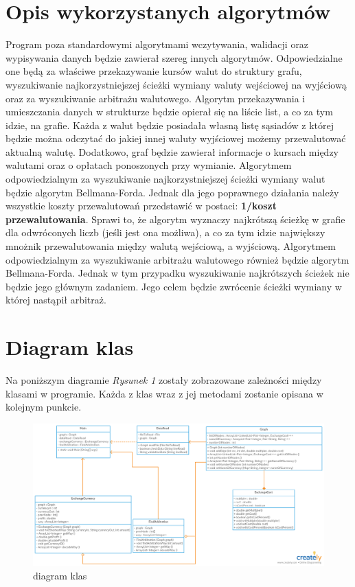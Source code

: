 ﻿\documentclass[12pt]{article}
\begin{document}
\section{Opis wykorzystanych algorytmów}
Program poza standardowymi algorytmami wczytywania, walidacji oraz wypisywania danych będzie zawierał szereg innych algorytmów. Odpowiedzialne one będą za właściwe przekazywanie kursów walut do struktury grafu, wyszukiwanie najkorzystniejszej ścieżki wymiany waluty wejściowej na wyjściową oraz za wyszukiwanie arbitrażu walutowego.
\newline\newline
Algorytm przekazywania i umieszczania danych w strukturze będzie opierał się na liście list, a co za tym idzie, na grafie. Każda z walut będzie posiadała własną listę sąsiadów z której będzie można odczytać do jakiej innej waluty wyjściowej możemy przewalutować aktualną walutę. Dodatkowo, graf będzie zawierał informacje o kursach między walutami oraz o opłatach ponoszonych przy wymianie.
\newline\newline
Algorytmem odpowiedzialnym za wyszukiwanie najkorzystniejszej ścieżki wymiany walut będzie algorytm Bellmana-Forda. Jednak dla jego poprawnego działania należy wszystkie koszty przewalutowań przedstawić w postaci: \textbf{1/koszt przewalutowania}. Sprawi to, że algorytm wyznaczy najkrótszą ścieżkę w grafie dla odwróconych liczb (jeśli jest ona możliwa), a co za tym idzie największy mnożnik przewalutowania między walutą wejściową, a wyjściową.
\newline\newline
Algorytmem odpowiedzialnym za wyszukiwanie arbitrażu walutowego również będzie algorytm Bellmana-Forda. Jednak w tym przypadku wyszukiwanie najkrótszych ścieżek nie będzie jego głównym zadaniem. Jego celem będzie zwrócenie ścieżki wymiany w której nastąpił arbitraż.

\section{Diagram klas}
Na poniższym diagramie \emph{Rysunek 1} zostały zobrazowane zależności między klasami w programie. Każda z klas wraz z jej metodami zostanie opisana w kolejnym punkcie.

\begin{figure}[h!]
\centerline{\includegraphics[scale=0.37]{diagram}}
\caption{diagram klas}
\label{fig:diagram}
\end{figure}
\end{document}
